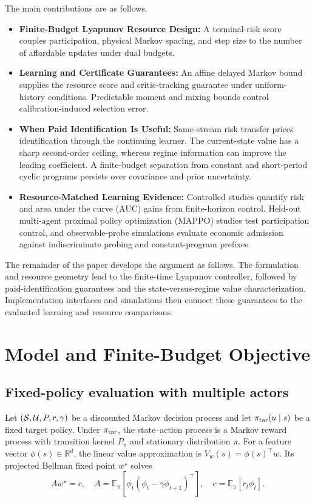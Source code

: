 \documentclass[journal]{IEEEtran}
\newcommand{\E}{\mathbb{E}}
\newcommand{\R}{\mathbb{R}}
\begin{document}
The main contributions are as follows.
\begin{itemize}
\item \textbf{Finite-Budget Lyapunov Resource Design:} A terminal-risk score couples participation, physical Markov spacing, and step size to the number of affordable updates under dual budgets.
\item \textbf{Learning and Certificate Guarantees:} An affine delayed Markov bound supplies the resource score and critic-tracking guarantee under uniform-history conditions.
Predictable moment and mixing bounds control calibration-induced selection error.
\item \textbf{When Paid Identification Is Useful:} Same-stream risk transfer prices identification through the continuing learner.
The current-state value has a sharp second-order ceiling, whereas regime information can improve the leading coefficient.
A finite-budget separation from constant and short-period cyclic programs persists over covariance and prior uncertainty.
\item \textbf{Resource-Matched Learning Evidence:} Controlled studies quantify risk and area under the curve (AUC) gains from finite-horizon control.
Held-out multi-agent proximal policy optimization (MAPPO) studies test participation control, and observable-probe simulations evaluate economic admission against indiscriminate probing and constant-program prefixes.
\end{itemize}

The remainder of the paper develops the argument as follows.
The formulation and resource geometry lead to the finite-time Lyapunov controller, followed by paid-identification guarantees and the state-versus-regime value characterization.
Implementation interfaces and simulations then connect these guarantees to the evaluated learning and resource comparisons.

\section{Model and Finite-Budget Objective}
\subsection{Fixed-policy evaluation with multiple actors}
Let $({\cal S},{\cal U},P,r,\gamma)$ be a discounted Markov decision process and let $\pi_{\rm tar}(u\mid s)$ be a fixed target policy.
Under $\pi_{\rm tar}$, the state--action process is a Markov reward process with transition kernel $P_{\pi}$ and stationary distribution $\pi$.
For a feature vector $\phi(s)\in\R^d$, the linear value approximation is $V_w(s)=\phi(s)^\top w$.
Its projected Bellman fixed point $w^\star$ solves
\begin{equation}
A w^\star=c,
\quad
A=\E_\pi[\phi_t(\phi_t-\gamma\phi_{t+1})^\top],
\quad
c=\E_\pi[r_t\phi_t].
\label{eq:projected-fixed-point}
\end{equation}
\end{document}
